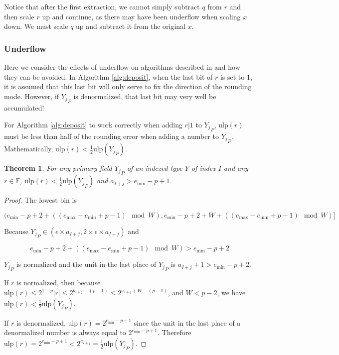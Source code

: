 \documentclass[12pt]{article}
\providecommand{\F}{\ensuremath{\mathbb{F}}}
\providecommand{\min}{\ensuremath{\text{min}}}
\providecommand{\max}{\ensuremath{\text{max}}}
\providecommand{\ulp}{\ensuremath{\text{ulp}}}
\theoremstyle{plain}
\newtheorem{thm}{Theorem}[section]
\begin{document}
      Notice that after the first extraction, we cannot simply subtract $q$ from $r$ and then scale $r$ up and continue, as there may have been underflow when scaling $x$ down. We must scale $q$ up and subtract it from the original $x$.

    \subsubsection{Underflow}
      \label{sec:underflow}
      Here we consider the effects of underflow on algorithms described in \cite{repsum} and how they can be avoided. In Algorithm \ref{alg:deposit}, when the last bit of $r$ is set to 1, it is assumed that this last bit will only serve to fix the direction of the rounding mode. However, if ${Y_j}_P$ is denormalized, that last bit may very well be accumulated!

      For Algorithm \ref{alg:deposit} to work correctly when adding $r | 1$ to ${Y_j}_P$, $\ulp(r)$ must be less than half of the rounding error when adding a number to ${Y_j}_P$. Mathematically, $\ulp(r) < \frac{1}{2}\ulp({Y_j}_P)$.

      \begin{thm}
        For any primary field ${Y_j}_P$ of an indexed type $Y$ of index $I$ and any $r \in \F$, $\ulp(r) < \frac{1}{2}\ulp({Y_j}_P)$ and $a_{I + j} > e_{\min} - p + 1$.
        \label{thm:underflowulp}
      \end{thm}
      \begin{proof}
      The lowest bin is

      \begin{equation*}
      (e_{\min} - p + 2 + ((e_{\max} - e_{\min} + p - 1 ) \mod W), e_{\min} - p + 2 + W + ((e_{\max} - e_{\min} + p - 1)\mod W)]
      \end{equation*}

      Because ${Y_j}_P \in (\epsilon \times a_{I + j}, 2 \times \epsilon \times a_{I + j})$ and

      \begin{equation*}
      e_{\min} - p + 2 + ((e_{\max} - e_{\min} + p- 1) \mod W) > e_{\min} - p + 2
      \end{equation*}

      ${Y_j}_P$ is normalized and the unit in the last place of ${Y_j}_P$ is $a_{I + j} + 1 > e_{\min} - p + 2$.

      If $r$ is normalized, then because $\ulp(r) \leq 2^{1 - p}|r| \leq 2^{b_{I + j} - (p - 1)} \leq 2^{a_{I + j} + W - (p - 1)}$, and $W < p - 2$, we have $\ulp(r) < \frac{1}{2}\ulp({Y_j}_P)$.

      If $r$ is denormalized, $\ulp(r) = 2^{e_{\min} - p + 1}$ since the unit in the last place of a denormalized number is always equal to $2^{e_{\min} - p + 1}$. Therefore $\ulp(r) = 2^{e_{\min} - p + 1} < 2^{a_{I + j}} = \frac{1}{2}\ulp({Y_j}_P)$.
      \end{proof}
\end{document}
